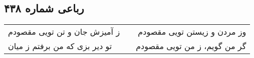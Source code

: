\begin{center}
\section*{رباعی شماره ۴۳۸}
\label{sec:sh438}
\begin{longtable}{l p{0.5cm} r}
ز آمیزش جان و تن تویی مقصودم
&&
وز مردن و زیستن تویی مقصودم
\\
تو دیر بزی که من برفتم ز میان
&&
گر من گویم، ز من تویی مقصودم
\\
\end{longtable}
\end{center}
